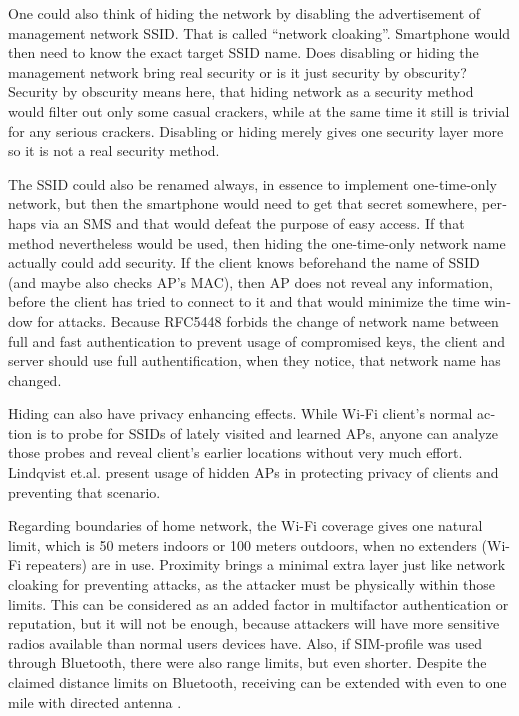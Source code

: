 \documentclass[12pt,a4paper,english]{tutthesis}
\begin{document}
\begin{otherlanguage}{english}
\label{tag:hidessid}
One could also think of hiding the network by disabling the
advertisement of manage\-ment network SSID. That is called ``network
cloaking''.  Smartphone would then need to know the exact target SSID name.
Does disabling or hiding the management network bring real security or
is it just security by obscurity?  Security by obscurity means here,
that hiding network 
as a security method would filter out only some casual crackers, while
at the same time it still is trivial for any serious crackers.
Disabling or hiding  merely gives one security layer more so it is not
a real security method.

The SSID could also be renamed always, in essence to implement
one-time-only network, but then the smartphone would need to get that
secret somewhere, perhaps via an SMS and that would defeat the purpose
of easy access.  If that method nevertheless would be used, then
hiding the one-time-only network name actually could add security. 
If the client knows beforehand the name of SSID
(and maybe also checks AP's MAC), then AP does not reveal any information,
before the client has tried to connect to it and that would minimize
the time window for attacks. 
Because RFC5448 \cite[p.12]{rfc5448} forbids the change of network name between full and
fast authentication to prevent usage of compromised keys, the client
and server should use full authentification, when they notice, that
network name has changed.




 Hiding can also have privacy enhancing effects.
While Wi-Fi client's normal action is to probe for SSIDs of lately visited
and learned APs, anyone can analyze those probes and reveal client's
earlier locations without very much effort.
Lindqvist et.al. \cite{hidden-wlan} present usage of hidden
APs in protecting privacy of clients and preventing that scenario.



Regarding boundaries of home network, the Wi-Fi coverage gives 
one natural limit, which is 50 meters indoors or 100 meters outdoors,
when no extenders (Wi-Fi repeaters) are in use.
Proximity brings a minimal extra layer just like network cloaking 
for preventing attacks, as the attacker must be physically within
those limits.
This can be considered as an added factor in multifactor
authentication or reputation, but it will not be enough, because
attackers will have more sensitive  radios available than normal users
devices have. 
Also, if SIM-profile was used through Bluetooth, there were also
range limits, but even shorter. Despite the claimed distance limits
on Bluetooth, receiving can be extended with even to one mile with
directed antenna \cite{SANS-bluetooth-2007}.





\end{otherlanguage}
\end{document}
